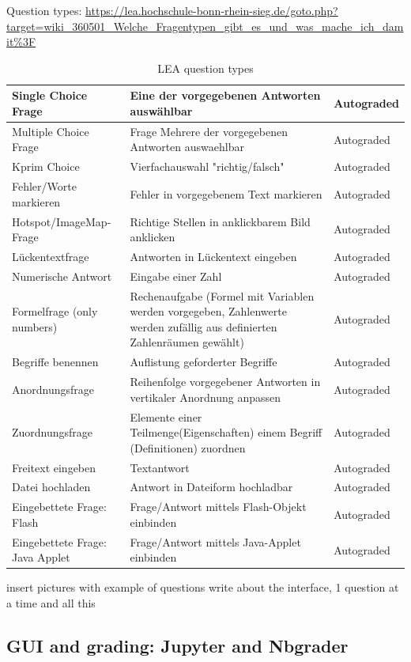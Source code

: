 \documentclass[11pt]{report}
\numberwithin{equation}{section} %
\begin{document}
Question types: \url{https://lea.hochschule-bonn-rhein-sieg.de/goto.php?target=wiki\_360501\_Welche\_Fragentypen\_gibt\_es\_und\_was\_mache\_ich\_damit\%3F}
\begin{table}[]
\centering
\caption{LEA question types}
\label{lea}
\begin{tabular}{|l|l|l|}
\hline
Single Choice Frage	
 & Eine der vorgegebenen Antworten auswählbar & Autograded \\ \hline
 Multiple Choice Frage & Frage	
Mehrere der vorgegebenen Antworten auswaehlbar & Autograded \\ \hline
 Kprim Choice & 	
Vierfachauswahl "richtig/falsch" & Autograded\\ \hline
 Fehler/Worte markieren & Fehler in vorgegebenem Text markieren & Autograded\\ \hline
 Hotspot/ImageMap-Frage & Richtige Stellen in anklickbarem Bild anklicken & Autograded\\ \hline
 Lückentextfrage & 	
Antworten in Lückentext eingeben & Autograded\\ \hline
 Numerische Antwort & Eingabe einer Zahl & Autograded\\ \hline
 Formelfrage (only numbers)	
 & Rechenaufgabe
(Formel mit Variablen werden vorgegeben, Zahlenwerte werden zufällig aus definierten Zahlenräumen gewählt) & Autograded\\ \hline
 Begriffe benennen & 	
Auflistung geforderter Begriffe & Autograded\\ \hline
 Anordnungsfrage  & Reihenfolge vorgegebener Antworten in vertikaler Anordnung anpassen & Autograded\\ \hline
 Zuordnungsfrage & Elemente einer Teilmenge(Eigenschaften) einem Begriff (Definitionen) zuordnen & Autograded\\ \hline
 Freitext eingeben & Textantwort & Autograded\\ \hline
 Datei hochladen & Antwort in Dateiform hochladbar & Autograded\\ \hline
 Eingebettete Frage: Flash & Frage/Antwort mittels Flash-Objekt einbinden & Autograded\\ \hline
 Eingebettete Frage: Java Applet & Frage/Antwort mittels Java-Applet einbinden & Autograded\\ \hline
\end{tabular}
\end{table}
 insert pictures with example of questions
 write about the interface, 1 question at a time and all this
 
\subsection{GUI and grading: Jupyter and Nbgrader}
\end{document}
